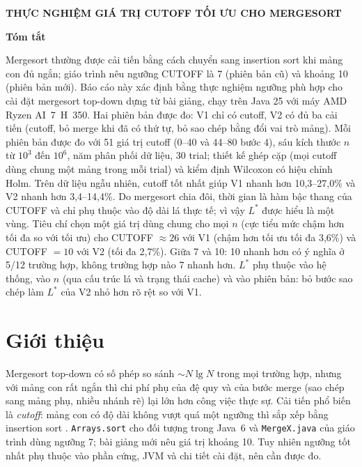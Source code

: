 \documentclass[11pt,a4paper]{article}
\renewenvironment{abstract}
  {\begin{center}\large\bfseries Tóm tắt\end{center}\vspace{-0.6\baselineskip}%
   \begin{list}{}{\setlength{\leftmargin}{0.6cm}\setlength{\rightmargin}{0.6cm}%
                  \setlength{\listparindent}{0pt}\setlength{\itemsep}{0pt}}%
   \item\relax\small\normalfont}
  {\end{list}\vspace{0.5\baselineskip}}
\begin{document}
\begin{center}
{\Large\bfseries THỰC NGHIỆM GIÁ TRỊ CUTOFF TỐI ƯU CHO MERGESORT\par}
\end{center}


\begin{abstract}
Mergesort thường được cải tiến bằng cách chuyển sang insertion sort khi mảng con đủ ngắn;
giáo trình nêu ngưỡng CUTOFF là 7 (phiên bản cũ) và khoảng 10 (phiên bản mới).
Báo cáo này xác định bằng thực nghiệm ngưỡng phù hợp cho cài đặt mergesort top-down
dựng từ bài giảng, chạy trên Java 25 với máy AMD Ryzen AI~7~H~350.
Hai phiên bản được đo: V1 chỉ có cutoff, V2 có đủ ba cải tiến (cutoff, bỏ merge khi đã có thứ tự,
bỏ sao chép bằng đổi vai trò mảng). Mỗi phiên bản được đo với 51 giá trị cutoff (0--40 và 44--80 bước 4),
sáu kích thước $n$ từ $10^3$ đến $10^6$, năm phân phối dữ liệu, 30 trial; thiết kế ghép cặp
(mọi cutoff dùng chung một mảng trong mỗi trial) và kiểm định Wilcoxon có hiệu chỉnh Holm.
Trên dữ liệu ngẫu nhiên, cutoff tốt nhất giúp V1 nhanh hơn 10,3--27,0\% và V2 nhanh hơn 3,4--14,4\%.
Do mergesort chia đôi, thời gian là hàm bậc thang của CUTOFF và chỉ phụ thuộc vào độ dài lá thực tế;
vì vậy $L^*$ được hiểu là một vùng. Tiêu chí chọn một giá trị dùng chung cho mọi $n$
(cực tiểu mức chậm hơn tối đa so với tối ưu) cho CUTOFF $\approx 26$ với V1 (chậm hơn tối ưu tối đa 3,6\%)
và CUTOFF $=10$ với V2 (tối đa 2,7\%). Giữa 7 và 10: 10 nhanh hơn có ý nghĩa ở 5/12 trường hợp,
không trường hợp nào 7 nhanh hơn. $L^*$ phụ thuộc vào hệ thống, vào $n$ (qua cấu trúc lá và trạng thái cache)
và vào phiên bản: bỏ bước sao chép làm $L^*$ của V2 nhỏ hơn rõ rệt so với V1.
\end{abstract}


\section{Giới thiệu}\label{sec:intro}
Mergesort top-down có số phép so sánh $\sim N\lg N$ trong mọi trường hợp, nhưng với mảng con rất ngắn
thì chi phí phụ của đệ quy và của bước merge (sao chép sang mảng phụ, nhiều nhánh rẽ) lại lớn hơn
công việc thực sự. Cải tiến phổ biến là \emph{cutoff}: mảng con có độ dài không vượt quá một ngưỡng
thì sắp xếp bằng insertion sort \citep{sedgewick,slides}. \texttt{Arrays.sort} cho đối tượng trong Java~6
và \texttt{MergeX.java} của giáo trình dùng ngưỡng 7; bài giảng mới nêu giá trị khoảng 10.
Tuy nhiên ngưỡng tốt nhất phụ thuộc vào phần cứng, JVM và chi tiết cài đặt, nên cần được đo.
\end{document}
